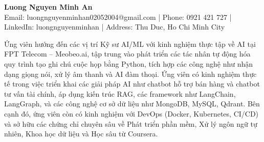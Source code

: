 \documentclass[a4paper,11pt]{article}
\newcommand{\sectiontitle}[1]{\vspace{0.5em}\noindent{\Large\color{primary}\textbf{#1}}\vspace{0.2em}}
\begin{document}
\pagestyle{empty}

\begin{center}
    {\Huge \color{text} \textbf{Luong Nguyen Minh An}} \\
    \vspace{0.2em}
    \small
    \color{text}
    Email: luongnguyenminhan02052004@gmail.com | Phone: 0921 421 727 | LinkedIn: luongnguyenminhan | Address: Thu Duc, Ho Chi Minh City
\end{center}

\vspace{0.5em}

\sectiontitle{Summary}
\noindent Ứng viên hướng đến các vị trí Kỹ sư AI/ML với kinh nghiệm thực tập về AI tại FPT Telecom – Meobeo.ai, tập trung vào phát triển các tác nhân tự động hóa quy trình tạo ghi chú cuộc họp bằng Python, tích hợp các công nghệ như nhận dạng giọng nói, xử lý âm thanh và AI đàm thoại. Ứng viên có kinh nghiệm thực tế trong việc triển khai các giải pháp AI như chatbot hỗ trợ bán hàng và chatbot tư vấn tài chính, áp dụng kiến trúc RAG, các framework như LangChain, LangGraph, và các công nghệ cơ sở dữ liệu như MongoDB, MySQL, Qdrant. Bên cạnh đó, ứng viên còn có kinh nghiệm với DevOps (Docker, Kubernetes, CI/CD) và sở hữu các chứng chỉ chuyên sâu về Phát triển phần mềm, Xử lý ngôn ngữ tự nhiên, Khoa học dữ liệu và Học sâu từ Coursera.

\vspace{0.5em}
\end{document}
